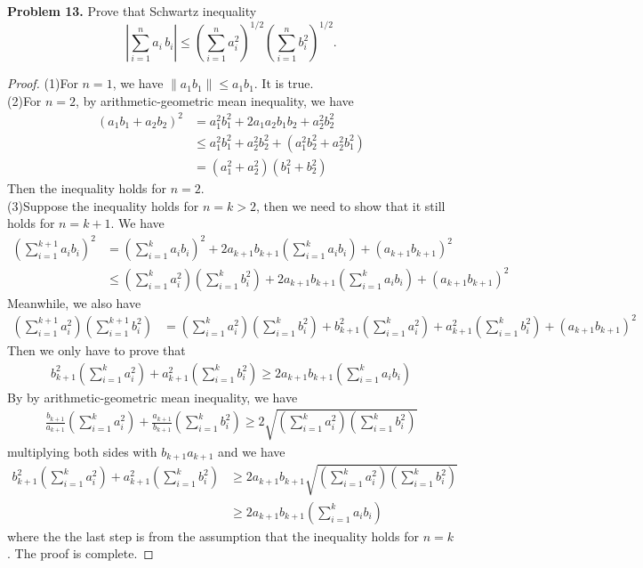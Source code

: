 \documentclass[12pt,leqno]{amsart}
\begin{document}
\medskip

\noindent
{\bf Problem 13.}
Prove that Schwartz inequality
$$
\left|\sum_{i=1}^n a_i\, b_i\right| \leq \left(\sum_{i=1}^n a_i^2\right)^{1/2}\left(\sum_{i=1}^n b_i^2\right)^{1/2}.
$$

\begin{proof}
(1)For $n = 1$, we have $\|a_1 b_1\| \leq a_1 b_1$. It is true.\\
\hspace*{2em}(2)For $n = 2$, by arithmetic-geometric mean inequality, we have 
\begin{align*}
    (a_1 b_1 + a_2 b_2)^2 & = a_1^2 b_1^2 + 2a_1 a_2 b_1 b_2 + a_2^2 b_2^2\\
    & \leq a_1^2 b_1^2 + a_2^2 b_2^2 + (a_1^2 b_2^2 + a_2^2 b_1^2) \\
    & = (a_1^2 + a_2^2)(b_1^2 + b_2^2)
\end{align*}
Then the inequality holds for $n = 2$.\\
\hspace*{2em}(3)Suppose the inequality holds for $n = k > 2$, then we need to show that it still holds for $n = k + 1$. We have
\begin{align*}
    \left(\sum^{k+1}_{i=1} a_i b_i\right)^2 & = \left(\sum^{k}_{i=1} a_i b_i\right)^2 + 2 a_{k+1} b_{k+1} \left(\sum^{k}_{i=1} a_i b_i\right) + (a_{k+1}b_{k+1})^2 \\
    & \leq \left(\sum^{k}_{i=1} a_i^2 \right) \left(\sum^{k}_{i=1} b_i^2 \right) + 2 a_{k+1} b_{k+1} \left(\sum^{k}_{i=1} a_i b_i\right) + (a_{k+1}b_{k+1})^2
\end{align*}
Meanwhile, we also have
\begin{align*}
    \left(\sum^{k+1}_{i=1} a_i^2 \right) \left(\sum^{k+1}_{i=1} b_i^2 \right) & = \left(\sum^{k}_{i=1} a_i^2 \right) \left(\sum^{k}_{i=1} b_i^2 \right) + b_{k+1}^2 \left(\sum^{k}_{i=1} a_i^2 \right) + a_{k+1}^2 \left(\sum^{k}_{i=1} b_i^2 \right) + (a_{k+1}b_{k+1})^2
\end{align*}
Then we only have to prove that 
\begin{align*}
    b_{k+1}^2 \left(\sum^{k}_{i=1} a_i^2 \right) + a_{k+1}^2 \left(\sum^{k}_{i=1} b_i^2 \right) \geq 2 a_{k+1} b_{k+1} \left(\sum^{k}_{i=1} a_i b_i\right)
\end{align*}
By by arithmetic-geometric mean inequality, we have 
\begin{align*}
    \frac{b_{k+1}}{a_{k+1}} \left(\sum^{k}_{i=1} a_i^2 \right) + \frac{a_{k+1}}{b_{k+1}} \left(\sum^{k}_{i=1} b_i^2 \right) \geq 2 \sqrt{\left(\sum^{k}_{i=1} a_i^2 \right) \left(\sum^{k}_{i=1} b_i^2 \right)}
\end{align*}
multiplying both sides with $b_{k+1} a_{k+1}$ and we have 
\begin{align*}
    b_{k+1}^2 \left(\sum^{k}_{i=1} a_i^2 \right) + a_{k+1}^2 \left(\sum^{k}_{i=1} b_i^2 \right) & \geq 2 a_{k+1} b_{k+1} \sqrt{\left(\sum^{k}_{i=1} a_i^2 \right) \left(\sum^{k}_{i=1} b_i^2 \right)} \\
    & \geq 2 a_{k+1} b_{k+1} \left(\sum^{k}_{i=1} a_i b_i\right)
\end{align*}
where the the last step is from the assumption that the inequality holds for $n = k$. The proof is complete.
\end{proof}
\end{document}
